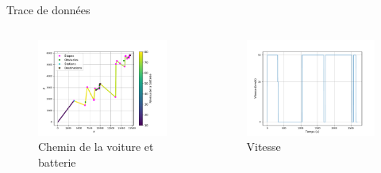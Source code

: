 \documentclass{beamer}
\begin{document}
\begin{frame}{Trace de données}

\begin{columns}
    
    \begin{column}{0.5\paperwidth}
        \begin{figure}
            \centering
            \includegraphics[width=0.55\paperwidth]{path.pdf}
            \caption{Chemin de la voiture et batterie}
        \end{figure}
    \end{column}
    
    \begin{column}{0.5\paperwidth}
       \begin{figure}
           \centering
           \includegraphics[width=0.55\paperwidth]{speed.pdf}
           \caption{Vitesse}
       \end{figure}
    \end{column}
    
\end{columns}

\end{frame}
\end{document}
